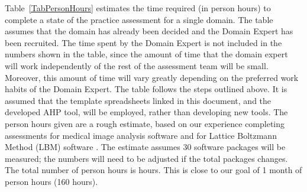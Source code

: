 \documentclass[runningheads]{llncs}
\newcounter{totHours} %
\begin{document}
Table~\ref{TabPersonHours} estimates the time required (in person hours) to
complete a state of the practice assessment for a single domain.  The table
assumes that the domain has already been decided and the Domain Expert has been
recruited.  The time spent by the Domain Expert is not included in the numbers
shown in the table, since the amount of time that the domain expert will work
independently of the rest of the assessment team will be small.  Moreover, this
amount of time will vary greatly depending on the preferred work habits of the
Domain Expert.  The table follows the steps outlined above. It is assumed that
the template spreadsheets linked in this document, and the developed AHP tool,
will be employed, rather than developing new tools.  The person hours given are
a rough estimate, based on our experience completing assessments for medical
image analysis software \cite{Dong2021} and for Lattice Boltzmann Method (LBM)
software \cite{Michalski2021}.  The estimate assumes 30 software packages will
be measured; the numbers will need to be adjusted if the total packages changes.
The total number of person hours is  hours.  This is close to
our goal of 1 month of person hours (160 hours).  
\end{document}
